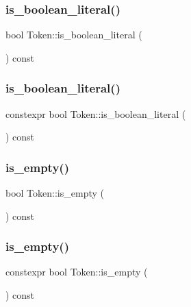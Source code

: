 \subsubsection{\texorpdfstring{is\+\_\+boolean\+\_\+literal()}{is\_boolean\_literal()}\hspace{0.1cm}{\footnotesize\ttfamily [1/2]}}
{\footnotesize\ttfamily bool Token\+::is\+\_\+boolean\+\_\+literal (\begin{DoxyParamCaption}{ }\end{DoxyParamCaption}) const}

\mbox{\label{class_token_a296a03d064fa381593ac2af270739859}} 
\subsubsection{\texorpdfstring{is\+\_\+boolean\+\_\+literal()}{is\_boolean\_literal()}\hspace{0.1cm}{\footnotesize\ttfamily [2/2]}}
{\footnotesize\ttfamily constexpr bool Token\+::is\+\_\+boolean\+\_\+literal (\begin{DoxyParamCaption}{ }\end{DoxyParamCaption}) const\hspace{0.3cm}{\ttfamily [inline]}}

\mbox{\label{class_token_aaebab1fc38280c1e7714254916495103}} 
\subsubsection{\texorpdfstring{is\+\_\+empty()}{is\_empty()}\hspace{0.1cm}{\footnotesize\ttfamily [1/2]}}
{\footnotesize\ttfamily bool Token\+::is\+\_\+empty (\begin{DoxyParamCaption}{ }\end{DoxyParamCaption}) const}

\mbox{\label{class_token_a9c8d38440d6d13ad1c8c943045e0a508}} 
\subsubsection{\texorpdfstring{is\+\_\+empty()}{is\_empty()}\hspace{0.1cm}{\footnotesize\ttfamily [2/2]}}
{\footnotesize\ttfamily constexpr bool Token\+::is\+\_\+empty (\begin{DoxyParamCaption}{ }\end{DoxyParamCaption}) const\hspace{0.3cm}{\ttfamily [inline]}}


